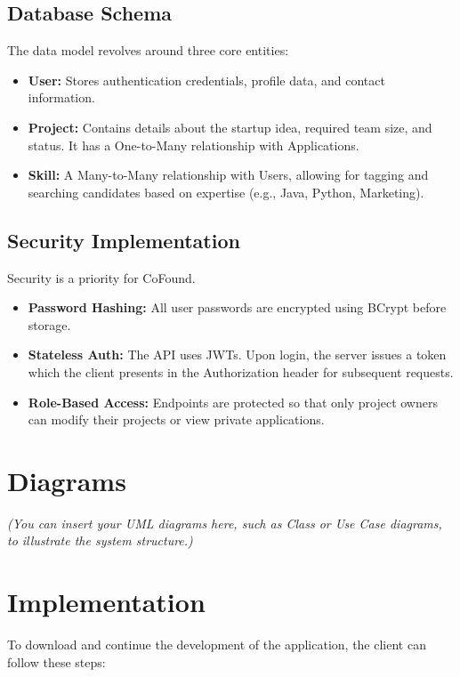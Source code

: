 \documentclass[12pt,a4paper]{article}
\begin{document}
\subsection{Database Schema}
The data model revolves around three core entities:
\begin{itemize}
    \item \textbf{User:} Stores authentication credentials, profile data, and contact information.
    \item \textbf{Project:} Contains details about the startup idea, required team size, and status. It has a One-to-Many relationship with Applications.
    \item \textbf{Skill:} A Many-to-Many relationship with Users, allowing for tagging and searching candidates based on expertise (e.g., Java, Python, Marketing).
\end{itemize}

\subsection{Security Implementation}
Security is a priority for CoFound.
\begin{itemize}
    \item \textbf{Password Hashing:} All user passwords are encrypted using BCrypt before storage.
    \item \textbf{Stateless Auth:} The API uses JWTs. Upon login, the server issues a token which the client presents in the Authorization header for subsequent requests.
    \item \textbf{Role-Based Access:} Endpoints are protected so that only project owners can modify their projects or view private applications.
\end{itemize}

\section{Diagrams}
\textit{(You can insert your UML diagrams here, such as Class or Use Case diagrams, to illustrate the system structure.)}


\section{Implementation}
To download and continue the development of the application, the client can follow these steps:
\end{document}
